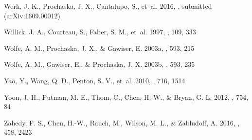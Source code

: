 \documentclass[twocolumn,twocolappendix,tighten,times]{aastex6}
\begin{document}
\begin{thebibliography}
 Werk, J. K., Prochaska, J. X., Cantalupo, S., et~al. 2016, \apj, submitted (arXiv:1609.00012)

 Willick, J. A., Courteau, S., Faber, S. M., et~al. 1997, \apjs, 109, 333

 Wolfe, A. M., Prochaska, J. X., \&  Gawiser, E. 2003a, \apj, 593, 215

 Wolfe, A. M., Gawiser, E., \& Prochaska, J. X. 2003b, \apj, 593, 235

 Yao, Y., Wang, Q. D., Penton, S. V., et~al. 2010, \apj, 716, 1514

 Yoon, J. H., Putman, M. E., Thom, C., Chen, H.-W., \& Bryan, G. L. 2012, \apj, 754, 84

 Zahedy, F. S., Chen, H.-W., Rauch, M., Wilson, M. L., \& Zabludoff, A. 2016, \mnras, 458, 2423

\end{thebibliography}
\end{document}
